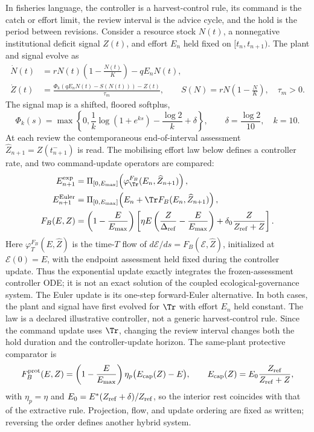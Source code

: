 In fisheries language, the controller is a harvest-control rule, its command is the catch or effort limit, the review interval is the advice cycle, and the hold is the period between revisions. Consider a resource stock \(N(t)\), a nonnegative institutional deficit signal \(Z(t)\), and effort \(E_n\) held fixed on \([t_n,t_{n+1})\). The plant and signal evolve as
\begin{align}
\dot N(t)&=rN(t)\left(1-\frac{N(t)}{K}\right)-qE_nN(t),\label{eq:plant}\\
\dot Z(t)&=\frac{\Phi_k\!\left(qE_nN(t)-S(N(t))\right)-Z(t)}{\tau_m},\qquad
S(N)=rN\left(1-\frac{N}{K}\right),\quad \tau_m>0.\label{eq:signal}
\end{align}
The signal map is a shifted, floored softplus,
\[
\Phi_k(s)=\max\!\left\{0,\frac{1}{k}\log(1+e^{ks})-\frac{\log 2}{k}+\delta\right\},
\qquad \delta=\frac{\log 2}{10},\quad k=10.
\]
At each review the contemporaneous end-of-interval assessment \(\widehat Z_{n+1}=Z(t_{n+1}^{-})\) is read. The mobilising effort law below defines a controller rate, and two command-update operators are compared:
\begin{align}
E_{n+1}^{\rm exp}&=\Pi_{[0,E_{\max}]}\!\left(\varphi_{\Tr}^{F_B}(E_n,\widehat Z_{n+1})\right),\label{eq:review-exp}\\
E_{n+1}^{\rm Euler}&=\Pi_{[0,E_{\max}]}\!\left(E_n+\Tr F_B(E_n,\widehat Z_{n+1})\right),\label{eq:review}\\
F_B(E,Z)&=\left(1-\frac{E}{E_{\max}}\right)
\left[\eta E\left(\frac{Z}{\Delta_{\rm ref}}-\frac{E}{E_{\max}}\right)
+\delta_0\frac{Z}{Z_{\rm ref}+Z}\right].\label{eq:effort}
\end{align}
Here \(\varphi_T^{F_B}(E,\widehat Z)\) is the time-\(T\) flow of \(d\mathcal E/ds=F_B(\mathcal E,\widehat Z)\), initialized at \(\mathcal E(0)=E\), with the endpoint assessment held fixed during the controller update. Thus the exponential update exactly integrates the frozen-assessment controller ODE; it is not an exact solution of the coupled ecological-governance system. The Euler update is its one-step forward-Euler alternative. In both cases, the plant and signal have first evolved for \(\Tr\) with effort \(E_n\) held constant. The law is a declared illustrative controller, not a generic harvest-control rule. Since the command update uses \(\Tr\), changing the review interval changes both the hold duration and the controller-update horizon. The same-plant protective comparator is
\[
F_B^{\rm prot}(E,Z)=\left(1-\frac{E}{E_{\max}}\right)\eta_p\bigl(E_{\rm cap}(Z)-E\bigr),\qquad
E_{\rm cap}(Z)=E_0\frac{Z_{\rm ref}}{Z_{\rm ref}+Z},
\]
with \(\eta_p=\eta\) and \(E_0=E^*(Z_{\rm ref}+\delta)/Z_{\rm ref}\), so the interior rest coincides with that of the extractive rule. Projection, flow, and update ordering are fixed as written; reversing the order defines another hybrid system.

